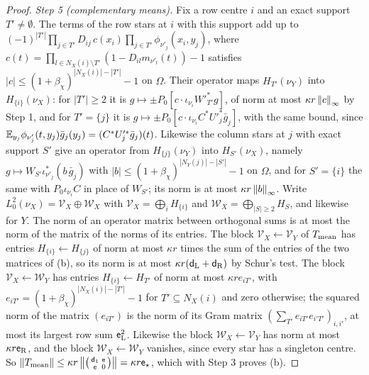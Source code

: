 \begin{proof}
\emph{Step 5 (complementary means).} Fix a row centre $i$ and an exact support
$T'\ne\emptyset$. The terms of the row stars at $i$ with this support add up to
$(-1)^{|T'|}\prod_{j\in T'}D_{ij}\,c(x_i)\prod_{j\in T'}\phi_{\nu'_j}(x_i,y_j)$, where
$c(t)=\prod_{l\in N_X(i)\setminus T'}(1-D_{il}m_{\nu'_l}(t))-1$ satisfies
$|c|\le(1+\beta_\chi)^{|N_X(i)|-|T'|}-1$ on $\Omega$. Their operator maps
$H_{T'}(\nu_Y)$ into $H_{\{i\}}(\nu_X)$: for $|T'|\ge2$ it is
$g\mapsto\pm P_0[c\cdot\iota_{\nu_i}W'^*_{T'}g]$, of norm at most $\kappa r\left\|c\right\|_\infty$
by Step 1, and for $T'=\{j\}$ it is $g\mapsto\pm P_0[c\cdot\iota_{\nu_i}C^*U'^*_j\bar
g_j]$, with the same bound, since
$\mathbb E_{y_j}\phi_{\nu'_j}(t,y_j)\bar g_j(y_j)=(C^*U'^*_j\bar g_j)(t)$. Likewise the column
stars at $j$ with exact support $S'$ give an operator from $H_{\{j\}}(\nu_Y)$ into
$H_{S'}(\nu_X)$, namely $g\mapsto W_{S'}\iota_{\nu'_j}^*(b\,\bar g_j)$ with
$|b|\le(1+\beta_\chi)^{|N_Y(j)|-|S'|}-1$ on $\Omega$, and for $S'=\{i\}$ the same with
$P_0\iota_{\nu_i}C$ in place of $W_{S'}$; its norm is at most $\kappa r\left\|b\right\|_\infty$.
Write $L^2_0(\nu_X)=\mathcal V_X\oplus\mathcal W_X$ with
$\mathcal V_X=\bigoplus_iH_{\{i\}}$ and $\mathcal W_X=\bigoplus_{|S|\ge2}H_S$, and likewise
for $Y$. The norm of an operator matrix between orthogonal sums is at most the norm of
the matrix of the norms of its entries. The block $\mathcal V_X\leftarrow\mathcal V_Y$
of $T_{\rm mean}$ has entries $H_{\{i\}}\leftarrow H_{\{j\}}$ of norm at most $\kappa r$
times the sum of the entries of the two matrices of (b), so its norm is at most
$\kappa r(\mathsf d_{\rm L}+\mathsf d_{\rm R})$ by Schur's test. The block
$\mathcal V_X\leftarrow\mathcal W_Y$ has entries $H_{\{i\}}\leftarrow H_{T'}$ of norm at
most $\kappa re_{iT'}$, with $e_{iT'}=(1+\beta_\chi)^{|N_X(i)|-|T'|}-1$ for
$T'\subseteq N_X(i)$ and zero otherwise; the squared norm of the matrix $(e_{iT'})$ is
the norm of its Gram matrix $(\sum_{T'}e_{iT'}e_{i'T'})_{i,i'}$, at most its largest row
sum $\mathsf e_{\rm L}^2$. Likewise the block $\mathcal W_X\leftarrow\mathcal V_Y$ has
norm at most $\kappa r\mathsf e_{\rm R}$, and the block $\mathcal W_X\leftarrow\mathcal W_Y$
vanishes, since every star has a singleton centre. So
$\left\|T_{\rm mean}\right\|\le\kappa r\left\|\begin{psmallmatrix}\mathsf d_1&\mathsf e\\
\mathsf e&0\end{psmallmatrix}\right\|=\kappa r\mathsf e_\star$, which with Step 3 proves (b).


\end{proof}
